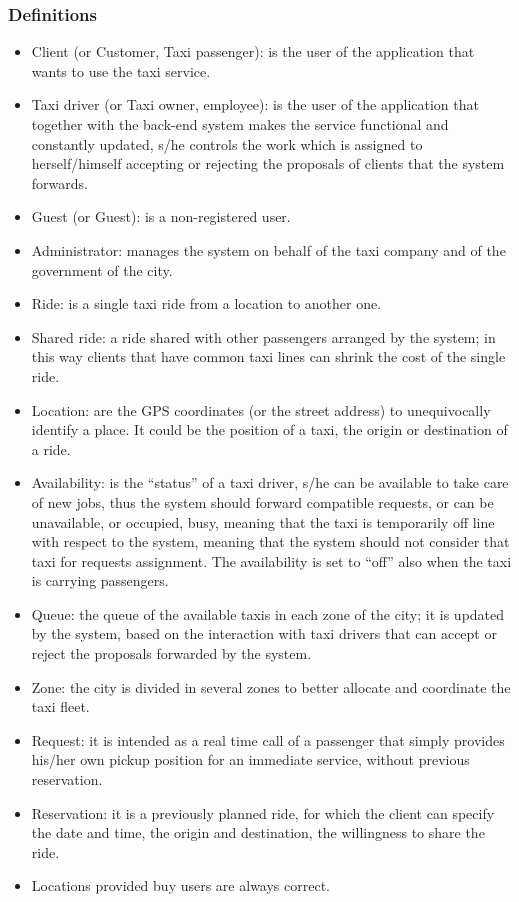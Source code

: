 \documentclass[a4paper,11pt]{report} %
\begin{document}
	\subsubsection{Definitions}
		\begin{itemize}
			\item Client (or Customer, Taxi passenger): is the user of the application that wants to use the taxi service.
			\item Taxi driver (or Taxi owner, employee): is the user of the application that together with the back-end system makes the service functional and constantly updated, s/he controls the work which is assigned to herself/himself accepting or rejecting the proposals of clients that the system forwards. 
			\item Guest (or Guest): is a non-registered user.
			\item Administrator: manages the system on behalf of the taxi company and of the government of the city.
			\item Ride: is a single taxi ride from a location to another one.
			\item Shared ride: a ride shared with other passengers arranged by the system; in this way clients that have common taxi lines can shrink the cost of the single ride.
			\item Location: are the GPS coordinates (or the street address) to unequivocally identify a place. It could be the position of a taxi, the origin or destination of a ride.
			\item Availability: is the ``status'' of a taxi driver, s/he can be available to take care of new jobs, thus the system should forward compatible requests, or can be unavailable, or occupied, busy, meaning that the taxi is temporarily off line with respect to the system, meaning that the system should not consider that taxi for requests assignment. The availability is set to ``off'' also when the taxi is carrying passengers.
			\item Queue: the queue of the available taxis in each zone of the city; it is updated by the system, based on the interaction with taxi drivers that can accept or reject the proposals forwarded by the system. 
			\item Zone: the city is divided in several zones to better allocate and coordinate the taxi fleet.
			\item Request: it is intended as a real time call of a passenger that simply provides his/her own pickup position for an immediate service, without previous reservation.
			\item Reservation: it is a previously planned ride, for which the client can specify the date and time, the origin and destination, the willingness to share the ride.
			\item Locations provided buy users are always correct.
		\end{itemize}
		
\end{document}
